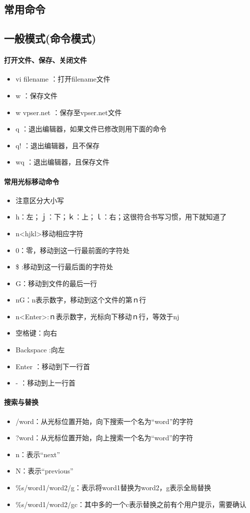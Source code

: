 {\subsection{常用命令}
\subsection{一般模式(命令模式)}
\paragraph{打开文件、保存、关闭文件}
\begin{itemize}
\item vi filename ：打开filename文件
\item w ：保存文件
\item w vpser.net ：保存至vpser.net文件
\item q ：退出编辑器，如果文件已修改则用下面的命令
\item q! ：退出编辑器，且不保存
\item wq ：退出编辑器，且保存文件
\end{itemize}


\paragraph{常用光标移动命令}
\begin{itemize}
\item {\color{red}注意区分大小写}
\item h：左；ｊ：下；ｋ：上；ｌ：右；这很符合书写习惯，用下就知道了
\item n<hjkl>移动相应字符
\item 0：零，移动到这一行最前面的字符处
\item \$ :移动到这一行最后面的字符处
\item G：移动到文件的最后一行
\item nG：n表示数字，移动到这个文件的第ｎ行
\item n<Enter>:ｎ表示数字，光标向下移动ｎ行，等效于nj
\item 空格键：向右
\item Backspace :向左
\item Enter ：移动到下一行首
\item - ：移动到上一行首
\end{itemize}


\paragraph{搜索与替换}
\begin{itemize}
\item /word：从光标位置开始，向下搜索一个名为“word”的字符
\item ?word：从光标位置开始，向上搜索一个名为“word”的字符
\item n：表示“next”
\item N：表示“previous”
\item \%s/word1/word2/g：表示将word1替换为word2，g表示全局替换
\item \%s/word1/word2/gc：其中多的一个c表示替换之前有个用户提示，需要确认
\end{itemize}


}
